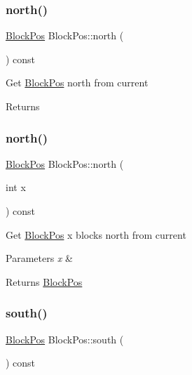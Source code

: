 \subsubsection{\texorpdfstring{north()}{north()}\hspace{0.1cm}{\footnotesize\ttfamily [1/2]}}
{\footnotesize\ttfamily \mbox{\hyperlink{struct_block_pos}{Block\+Pos}} Block\+Pos\+::north (\begin{DoxyParamCaption}{ }\end{DoxyParamCaption}) const}

Get \mbox{\hyperlink{struct_block_pos}{Block\+Pos}} north from current \begin{DoxyReturn}{Returns}

\end{DoxyReturn}
\mbox{\label{struct_block_pos_a7a622e4dd7cd2f2c4b72d355095e4af7}} 
\subsubsection{\texorpdfstring{north()}{north()}\hspace{0.1cm}{\footnotesize\ttfamily [2/2]}}
{\footnotesize\ttfamily \mbox{\hyperlink{struct_block_pos}{Block\+Pos}} Block\+Pos\+::north (\begin{DoxyParamCaption}\item[{int}]{x }\end{DoxyParamCaption}) const}

Get \mbox{\hyperlink{struct_block_pos}{Block\+Pos}} x blocks north from current 
\begin{DoxyParams}{Parameters}
{\em x} & \\
\hline
\end{DoxyParams}
\begin{DoxyReturn}{Returns}
\mbox{\hyperlink{struct_block_pos}{Block\+Pos}} 
\end{DoxyReturn}
\mbox{\label{struct_block_pos_af898a24e0c174884bf0089e451863a16}} 
\subsubsection{\texorpdfstring{south()}{south()}\hspace{0.1cm}{\footnotesize\ttfamily [1/2]}}
{\footnotesize\ttfamily \mbox{\hyperlink{struct_block_pos}{Block\+Pos}} Block\+Pos\+::south (\begin{DoxyParamCaption}{ }\end{DoxyParamCaption}) const}

